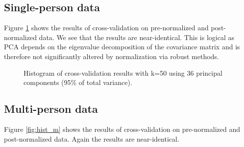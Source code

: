 \documentclass[paper=a4, fontsize=11pt]{scrartcl} %
\begin{document}
\subsection{Single-person data}
Figure \ref{fig:hist} shows the results of cross-validation on pre-normalized and post-normalized data. We see that the results are near-identical. This is logical as PCA depends on the eigenvalue decomposition of the covariance matrix and is therefore not significantly altered by normalization via robust methods.

\begin{figure}[h]
    \centering
    \caption{Histogram of cross-validation results with k=50 using 36 principal components (95\% of total variance).}
    \label{fig:hist}
\end{figure}

\clearpage
\subsection{Multi-person data}

Figure \ref{fig:hist_m} shows the results of cross-validation on pre-normalized and post-normalized data. Again the results are near-identical.%
\end{document}
